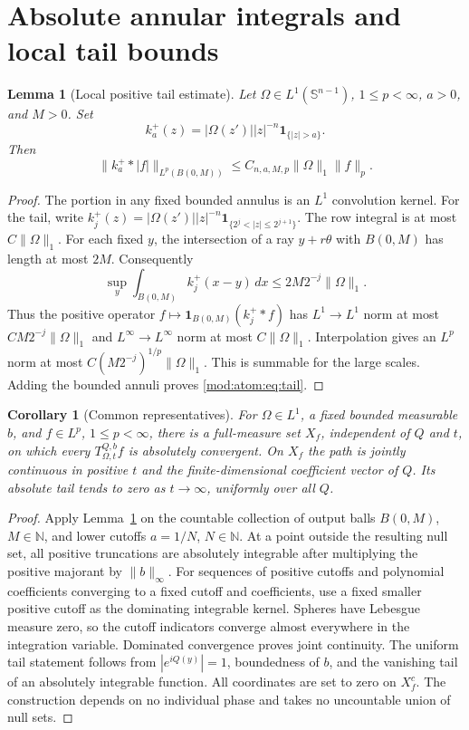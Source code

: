 \documentclass[11pt]{article}
\numberwithin{equation}{section}
\newtheorem{lemma}[theorem]{Lemma}
\newtheorem{corollary}[theorem]{Corollary}
\theoremstyle{remark}
\theoremstyle{definition}
\newcommand{\Sph}{\mathbb S}
\newcommand{\norm}[1]{\lVert #1\rVert}
\begin{document}
\section{Absolute annular integrals and local tail bounds}\label{mod:atom:sec:tails}
\begin{lemma}[Local positive tail estimate]\label{mod:atom:lem:tail}
Let $\Omega\in L^1(\Sph^{n-1})$, $1\le p<\infty$, $a>0$, and $M>0$.
Set
\[
 k_a^+(z)=|\Omega(z')||z|^{-n}\mathbf1_{\{|z|>a\}}.
\]
Then
\begin{equation}\label{mod:atom:eq:tail}
 \norm{k_a^+*|f|}_{L^p(B(0,M))}
 \le C_{n,a,M,p}\norm\Omega_1\norm f_p.
\end{equation}
\end{lemma}
\begin{proof}
The portion in any fixed bounded annulus is an $L^1$ convolution kernel.
For the tail, write
$k_j^+(z)=|\Omega(z')||z|^{-n}\mathbf1_{\{2^j<|z|\le2^{j+1}\}}$.
The row integral is at most $C\norm\Omega_1$. For each fixed $y$, the
intersection of a ray $y+r\theta$ with $B(0,M)$ has length at most $2M$.
Consequently
\[
 \sup_y\int_{B(0,M)} k_j^+(x-y)\,dx
 \le 2M2^{-j}\norm\Omega_1.
\]
Thus the positive operator $f\mapsto\mathbf1_{B(0,M)}(k_j^+*f)$ has
$L^1\to L^1$ norm at most $CM2^{-j}\norm\Omega_1$ and
$L^\infty\to L^\infty$ norm at most $C\norm\Omega_1$. Interpolation gives
an $L^p$ norm at most
$C(M2^{-j})^{1/p}\norm\Omega_1$. This is summable for the large scales.
Adding the bounded annuli proves \eqref{mod:atom:eq:tail}.
\end{proof}

\begin{corollary}[Common representatives]\label{mod:atom:cor:representatives}
For $\Omega\in L^1$, a fixed bounded measurable $b$, and
$f\in L^p$, $1\le p<\infty$, there is a full-measure set $X_f$,
independent of $Q$ and $t$, on which every $T_{\Omega,t}^{Q,b}f$ is absolutely
convergent. On $X_f$ the path is jointly continuous in positive $t$ and
the finite-dimensional coefficient vector of $Q$. Its absolute tail
tends to zero as $t\to\infty$, uniformly over all $Q$.
\end{corollary}
\begin{proof}
Apply Lemma~\ref{mod:atom:lem:tail} on the countable collection of output balls
$B(0,M)$, $M\in\mathbb N$, and lower cutoffs $a=1/N$, $N\in\mathbb N$.
At a point outside the resulting null set, all positive truncations are
absolutely integrable after multiplying the positive majorant by
$\|b\|_\infty$. For sequences of positive cutoffs and polynomial
coefficients converging to a fixed cutoff and coefficients, use a fixed
smaller positive cutoff as the dominating integrable kernel. Spheres
have Lebesgue measure zero, so the cutoff indicators converge almost
everywhere in the integration variable. Dominated convergence proves
joint continuity. The uniform tail statement follows from $|e^{iQ(y)}|=1$, boundedness
of $b$, and the vanishing tail of an absolutely integrable function.
All coordinates are set to zero on $X_f^c$. The construction depends
on no individual phase and takes no uncountable union of null sets.
\end{proof}
\end{document}
